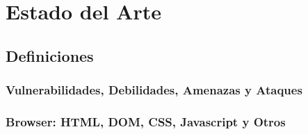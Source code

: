 \chapter{Estado del Arte}
\label{chap:chap2}

\section{Definiciones}
\label{sec:chap2.1}

\subsection{Vulnerabilidades, Debilidades, Amenazas y Ataques}
\label{sec:chap2.1.1}






\subsection{Browser: HTML, DOM, CSS, Javascript y Otros}
\label{sec:chap2.1.2}


